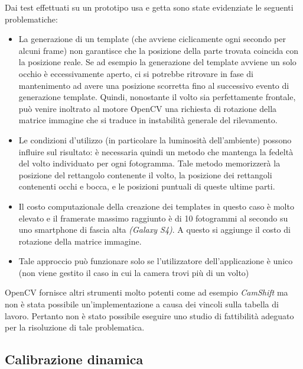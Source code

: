 Dai test effettuati su un prototipo usa e getta sono state evidenziate le seguenti problematiche:

\begin{itemize}
\item La generazione di un template (che avviene ciclicamente ogni secondo per alcuni frame) non garantisce che la posizione della parte trovata coincida con la posizione reale. Se ad esempio la generazione del template avviene un solo occhio è eccessivamente aperto, ci si potrebbe ritrovare in fase di mantenimento ad avere una posizione scorretta fino al successivo evento di generazione template. Quindi, nonostante il volto sia perfettamente frontale, può venire inoltrato al motore OpenCV una richiesta di rotazione della matrice immagine che si traduce in instabilità generale del rilevamento.
\item Le condizioni d'utilizzo (in particolare la luminosità dell'ambiente) possono influire sul risultato: è necessaria quindi un metodo che mantenga la fedeltà del volto individuato per ogni fotogramma. Tale metodo memorizzerà la posizione del rettangolo contenente il volto, la posizione dei rettangoli contenenti occhi e bocca, e le posizioni puntuali di queste ultime parti.
\item Il costo computazionale della creazione dei templates in questo caso è molto elevato e il framerate massimo raggiunto è di 10 fotogrammi al secondo su uno smartphone di fascia alta \textit{(Galaxy S4)}. A questo si aggiunge il costo di rotazione della matrice immagine.
\item Tale approccio può funzionare solo se l'utilizzatore dell'applicazione è unico (non viene gestito il caso in cui la camera trovi più di un volto)
\end{itemize}			

OpenCV fornisce altri strumenti molto potenti come ad esempio \textit{CamShift} ma non è stata possibile un'implementazione a causa dei vincoli sulla tabella di lavoro. Pertanto non è stato possibile eseguire uno studio di fattibilità adeguato per la risoluzione di tale problematica. 


\newpage
\subsection{Calibrazione dinamica}

